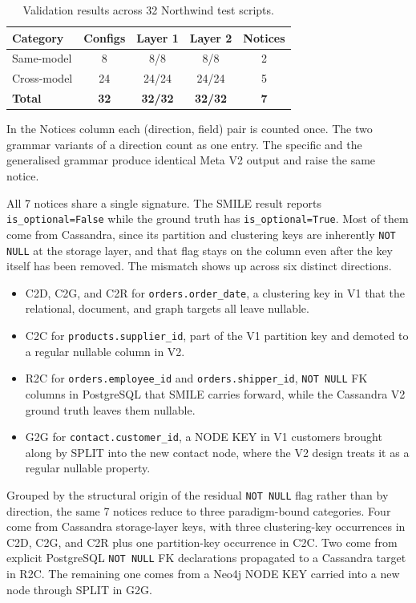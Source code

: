   \begin{table}[htbp]
  \centering
  \caption{Validation results across 32 Northwind test scripts.}
  \label{tab:eval-results}
  \renewcommand{\arraystretch}{1.15}
  \begin{tabular}{l c c c c}
  \toprule
  \textbf{Category} & \textbf{Configs} & \textbf{Layer 1} & \textbf{Layer 2} & \textbf{Notices} \\
  \midrule
  Same-model          & 8  & 8/8   & 8/8   & 2  \\
  Cross-model         & 24 & 24/24 & 24/24 & 5 \\
  \midrule
  \textbf{Total}      & \textbf{32} & \textbf{32/32} & \textbf{32/32} & \textbf{7} \\
  \bottomrule
  \end{tabular}
  \end{table}

  In the Notices column each (direction, field) pair is counted once.
  The two grammar variants of a direction count as one entry. The
  specific and the generalised grammar produce identical Meta V2
  output and raise the same notice.

  All 7 notices share a single signature. The SMILE result reports
  \texttt{is\_optional=False} while the ground truth has
  \texttt{is\_optional=True}. Most of them come from Cassandra,
  since its partition and clustering keys are inherently
  \texttt{NOT NULL} at the storage layer, and that flag stays on the
  column even after the key itself has been removed. The mismatch
  shows up across six distinct directions.
  \begin{itemize}
    \item C2D, C2G, and C2R for \texttt{orders.order\_date}, a
          clustering key in V1 that the relational, document, and
          graph targets all leave nullable.
    \item C2C for \texttt{products.supplier\_id}, part of the V1
          partition key and demoted to a regular nullable column
          in V2.
    \item R2C for \texttt{orders.employee\_id} and
          \texttt{orders.shipper\_id}, \texttt{NOT NULL} FK columns in
          PostgreSQL that SMILE carries forward, while the Cassandra
          V2 ground truth leaves them nullable.
    \item G2G for \texttt{contact.customer\_id}, a NODE KEY in V1
          customers brought along by SPLIT into the new contact node,
          where the V2 design treats it as a regular nullable
          property.
  \end{itemize}
  Grouped by the structural origin of the residual \texttt{NOT NULL}
  flag rather than by direction, the same 7 notices reduce to three
  paradigm-bound categories. Four come from Cassandra storage-layer
  keys, with three clustering-key occurrences in C2D, C2G, and C2R
  plus one partition-key occurrence in C2C. Two come from explicit
  PostgreSQL \texttt{NOT NULL} FK declarations propagated to a
  Cassandra target in R2C. The remaining one comes from a Neo4j
  NODE KEY carried into a new node through SPLIT in G2G.

